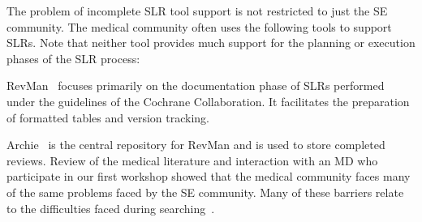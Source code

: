 The problem of incomplete SLR tool support is not restricted to just the SE community.
The medical community often uses the following tools to support SLRs.
Note that neither tool provides much support for the planning or execution phases of the SLR process:
\bi
\item
RevMan~\cite{RevMan} focuses primarily on the documentation phase of SLRs performed under the guidelines of the Cochrane Collaboration. 
It facilitates the preparation of formatted tables and version tracking. 
\item
Archie~\cite{Archie} is the central repository for RevMan and is used to store completed reviews. 
\ei
Review of the medical literature and interaction with an MD who participate in our first workshop showed that the medical community faces many of the same problems faced by the SE community.
Many of these barriers relate to the difficulties faced during searching~\cite{Bouamrane-etal:11, Frunza-etal:10, Young-Ward:01, Zwolsman-etal:13, Zwolsman-etal:12, Lai-etal:10}.
\vspace{8pt}